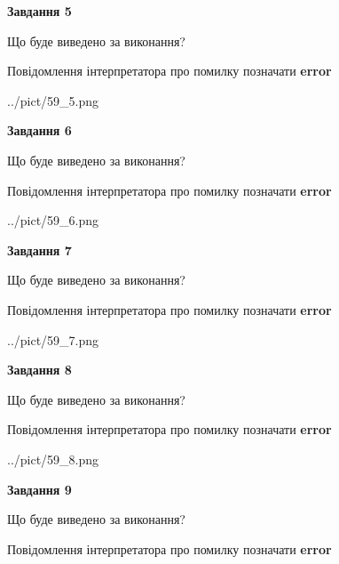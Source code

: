 \documentclass[11pt, ukrainian]{article}
\begin{document}
{\begin {large}
{\begin {center}\textbf{Завдання 5}\end {center}}\par
Що буде виведено за виконання? \par
Повідомлення інтерпретатора про помилку позначати \textbf{error}

\begin{center}
	{../pict/59_5.png}
\end{center}
\newpage

{\begin {center}\textbf{Завдання 6}\end {center}}\par
Що буде виведено за виконання? \par
Повідомлення інтерпретатора про помилку позначати \textbf{error}

\begin{center}
	{../pict/59_6.png}
\end{center}
\newpage

{\begin {center}\textbf{Завдання 7}\end {center}}\par
Що буде виведено за виконання? \par
Повідомлення інтерпретатора про помилку позначати \textbf{error}

\begin{center}
	{../pict/59_7.png}
\end{center}
\newpage

{\begin {center}\textbf{Завдання 8}\end {center}}\par
Що буде виведено за виконання? \par
Повідомлення інтерпретатора про помилку позначати \textbf{error}

\begin{center}
	{../pict/59_8.png}
\end{center}
\newpage

{\begin {center}\textbf{Завдання 9}\end {center}}\par
Що буде виведено за виконання? \par
Повідомлення інтерпретатора про помилку позначати \textbf{error}


\end{large}}
\end{document}
